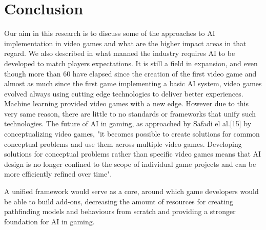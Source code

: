 \section{Conclusion}
Our aim in this research is to discuss some of the approaches to AI implementation in video games and what are the higher impact areas in that regard. We also described in what manned the industry requires AI to be developed to match players expectations. It is still a field in expansion, and even though more than 60 have elapsed since the creation of the first video game and almost as much since the first game implementing a basic AI system, video games evolved always using cutting edge technologies to deliver better experiences. Machine learning provided video games with a new edge. However due to this very same reason, there are little to no standards or frameworks that unify such technologies. The future of AI in gaming, as approached by Safadi el al.[15] by conceptualizing video games, "it becomes possible
to create solutions for common conceptual problems and use them across multiple video games. Developing solutions for conceptual problems rather than specific video games means that AI design is no longer confined to the scope of
individual game projects and can be more efficiently refined over time".

\vspace{2mm}
A unified framework would serve as a core, around which game developers would be able to build add-ons, decreasing the amount of resources for creating pathfinding models and behaviours from scratch and providing a stronger foundation for AI in gaming.



